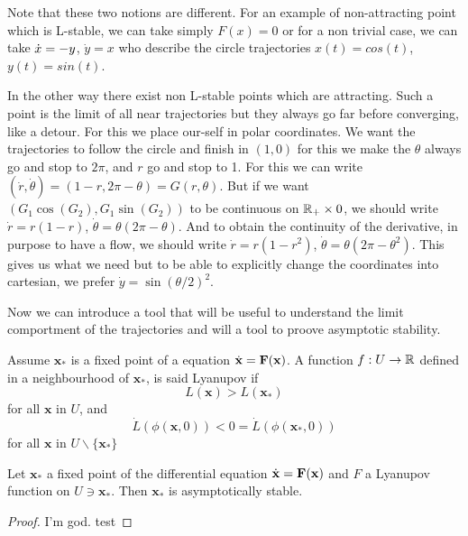 \begin{remarque}
Note that these two notions are different. For an example of non-attracting point which is L-stable, we can take simply $F(x)=0$ or for a non trivial case, we can take $\dot{x} = -y$, $\dot{y} = x$ who describe the circle trajectories $x(t)=cos(t)$, $y(t)=sin(t)$.

In the other way there exist non L-stable points which are attracting. Such a point is the limit of all near trajectories but they always go far before converging, like a detour. For this we place our-self in polar coordinates. We want the trajectories to follow the circle and finish in $(1,0)$ for this we make the $\theta$ always go and stop to $2\pi$, and $r$ go and stop to 1. For this we can write $(\dot{r},\dot{\theta})=(1-r,2\pi-\theta) = G(r,\theta)$. But if we want $(G_1\cos(G_2),G_1\sin(G_2))$ to be continuous on $\mathbb{R}_+\times 0$, we should write $\dot{r} = r(1-r)$, $\dot{\theta} = \theta(2\pi-\theta)$. And to obtain the continuity of the derivative, in purpose to have a flow, we should write $\dot{r} = r(1-r^2)$, $\dot{\theta} = \theta(2\pi-\theta^2)$. This gives us what we need but to be able to explicitly change the coordinates into cartesian, we prefer $\dot{y} = \sin(\theta/2)^2$.
\end{remarque}

Now we can introduce a tool that will be useful to understand the limit comportment of the trajectories and will a tool to proove asymptotic stability.

\begin{definition}
    Assume $\mathbf{x}_*$ is a fixed point of a equation $\dot{\mathbf{x}} = \mathbf{F}(\mathbf{x})$. A function $f:U\to\mathbb{R}$ defined in a neighbourhood of $\mathbf{x}_*$, is said Lyanupov if \[L(\mathbf{x})>L(\mathbf{x}_*)\] 
    for all $\mathbf{x}$ in $U$, and 
    \[ \dot{L}(\phi(\mathbf{x},0)) <0= \dot{L}(\phi(\mathbf{x}_*,0))\]
    for all $\mathbf{x}$ in $U\backslash\{\mathbf{x}_*\}$
\end{definition}

\begin{theoreme}
Let $\mathbf{x}_*$ a fixed point of the differential equation $\dot{\mathbf{x}} = \mathbf{F}(\mathbf{x})$ and $F$ a Lyanupov function on $U\ni\mathbf{x}_*$. Then $\mathbf{x}_*$ is asymptotically stable.
\end{theoreme}
\begin{proof}
I'm god. test
\end{proof}